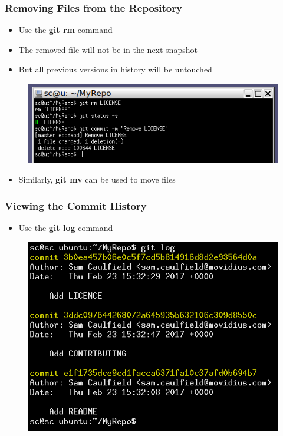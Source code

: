 \documentclass{beamer}
\begin{document}
\begin{frame}
	\frametitle{Removing Files from the Repository}
	\begin{itemize}
		\item{Use the \textbf{git rm} command}
		\item{The removed file will not be in the next snapshot}
		\item{But all previous versions in history will be untouched}
	\end{itemize}
	\begin{figure}
		\includegraphics[scale=0.62]{Removing_Files_from_the_Repository-0.png}
	\end{figure}
	\begin{itemize}
		\item{Similarly, \textbf{git mv} can be used to move files}
	\end{itemize}
\end{frame}

\begin{frame}
	\frametitle{Viewing the Commit History}
	\begin{itemize}
		\item{Use the \textbf{git log} command}
	\end{itemize}
	\begin{figure}
		\includegraphics[scale=0.4]{Viewing_the_Commit_History-0.png}
	\end{figure}
\end{frame}
\end{document}
